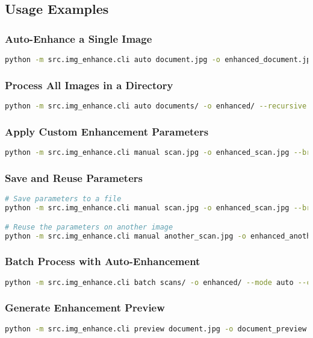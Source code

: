 \subsection{Usage Examples}

\subsubsection{Auto-Enhance a Single Image}
\begin{lstlisting}[language=bash]
python -m src.img_enhance.cli auto document.jpg -o enhanced_document.jpg --compare
\end{lstlisting}

\subsubsection{Process All Images in a Directory}
\begin{lstlisting}[language=bash]
python -m src.img_enhance.cli auto documents/ -o enhanced/ --recursive
\end{lstlisting}

\subsubsection{Apply Custom Enhancement Parameters}
\begin{lstlisting}[language=bash]
python -m src.img_enhance.cli manual scan.jpg -o enhanced_scan.jpg --brightness 1.3 --contrast 1.4 --denoise --deskew
\end{lstlisting}

\subsubsection{Save and Reuse Parameters}
\begin{lstlisting}[language=bash]
# Save parameters to a file
python -m src.img_enhance.cli manual scan.jpg -o enhanced_scan.jpg --brightness 1.3 --contrast 1.4 --denoise --save-params my_params.json

# Reuse the parameters on another image
python -m src.img_enhance.cli manual another_scan.jpg -o enhanced_another.jpg --params-file my_params.json
\end{lstlisting}

\subsubsection{Batch Process with Auto-Enhancement}
\begin{lstlisting}[language=bash]
python -m src.img_enhance.cli batch scans/ -o enhanced/ --mode auto --compare
\end{lstlisting}

\subsubsection{Generate Enhancement Preview}
\begin{lstlisting}[language=bash]
python -m src.img_enhance.cli preview document.jpg -o document_preview.png
\end{lstlisting} 